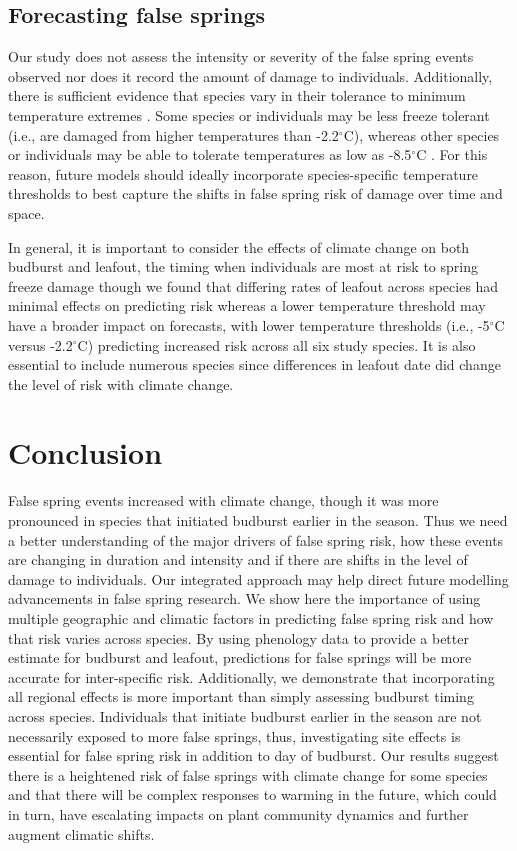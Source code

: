 \documentclass{article}\usepackage[]{graphicx}\usepackage[]{color}
\begin{document}
\subsection*{Forecasting false springs}
Our study does not assess the intensity or severity of the false spring events observed nor does it record the amount of damage to individuals. Additionally, there is sufficient evidence that species vary in their tolerance to minimum temperature extremes \citep{Korner2016, Lenz2013, Zhuo2018,bennett2018globtherm}. Some species or individuals may be less freeze tolerant (i.e., are damaged from higher temperatures than -2.2$^{\circ}$C), whereas other species or individuals may be able to tolerate temperatures as low as -8.5$^{\circ}$C \citep{Lenz2016}. For this reason, future models should ideally incorporate species-specific temperature thresholds to best capture the shifts in false spring risk of damage over time and space. 

In general, it is important to consider the effects of climate change on both budburst and leafout, the timing when individuals are most at risk to spring freeze damage \citep{Chamberlain2019,Lenz2016} though we found that differing rates of leafout across species had minimal effects on predicting risk whereas a lower temperature threshold may have a broader impact on forecasts, with lower temperature thresholds (i.e., -5$^{\circ}$C versus -2.2$^{\circ}$C) predicting increased risk across all six study species. It is also essential to include numerous species since differences in leafout date did change the level of risk with climate change. 

\section*{Conclusion}
False spring events increased with climate change, though it was more pronounced in species that initiated budburst earlier in the season. Thus we need a better understanding of the major drivers of false spring risk, how these events are changing in duration and intensity and if there are shifts in the level of damage to individuals. Our integrated approach may help direct future modelling advancements in false spring research. We show here the importance of using multiple geographic and climatic factors in predicting false spring risk and how that risk varies across species. By using phenology data to provide a better estimate for budburst and leafout, predictions for false springs will be more accurate for inter-specific risk. Additionally, we demonstrate that incorporating all regional effects is more important than simply assessing budburst timing across species. Individuals that initiate budburst earlier in the season are not necessarily exposed to more false springs, thus, investigating site effects is essential for false spring risk in addition to day of budburst. Our results suggest there is a heightened risk of false springs with climate change for some species and that there will be complex responses to warming in the future, which could in turn, have escalating impacts on plant community dynamics and further augment climatic shifts. 
\end{document}
